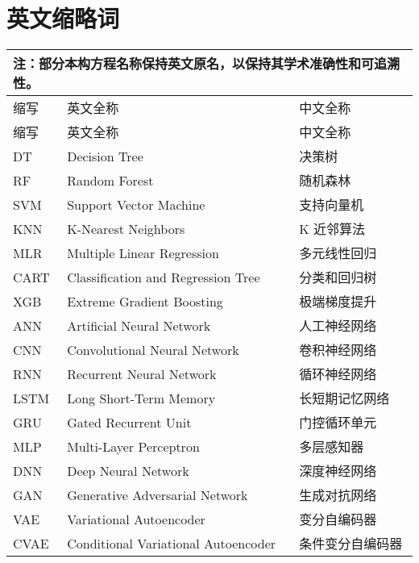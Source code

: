 \chapter{英文缩略词}
\begin{longtable}{lll}
	\\
	\multicolumn{3}{p{\textwidth}}{\small 注：部分本构方程名称保持英文原名，以保持其学术准确性和可追溯性。}                                        \\
	\hline
	缩写       & 英文全称                                               & 中文全称                                           \\
	\hline
	\endfirsthead
	\hline
	缩写       & 英文全称                                               & 中文全称                                           \\
	\hline
	\endhead
	\hline
	\endfoot
	DT       & Decision Tree                                      & 决策树\tabularnewline
	RF       & Random Forest                                      & 随机森林\tabularnewline
	SVM      & Support Vector Machine                             & 支持向量机\tabularnewline
	KNN      & K-Nearest Neighbors                                & K 近邻算法\tabularnewline
	MLR      & Multiple Linear Regression                         & 多元线性回归\tabularnewline
	CART     & Classification and Regression Tree                 & 分类和回归树\tabularnewline
	XGB      & Extreme Gradient Boosting                          & 极端梯度提升\tabularnewline

	ANN      & Artificial Neural Network                          & 人工神经网络\tabularnewline
	CNN      & Convolutional Neural Network                       & 卷积神经网络\tabularnewline
	RNN      & Recurrent Neural Network                           & 循环神经网络\tabularnewline
	LSTM     & Long Short-Term Memory                             & 长短期记忆网络\tabularnewline
	GRU      & Gated Recurrent Unit                               & 门控循环单元\tabularnewline
	MLP      & Multi-Layer Perceptron                             & 多层感知器\tabularnewline
	DNN      & Deep Neural Network                                & 深度神经网络\tabularnewline

	GAN      & Generative Adversarial Network                     & 生成对抗网络\tabularnewline
	VAE      & Variational Autoencoder                            & 变分自编码器\tabularnewline
	CVAE     & Conditional Variational Autoencoder                & 条件变分自编码器\tabularnewline


\end{longtable}
